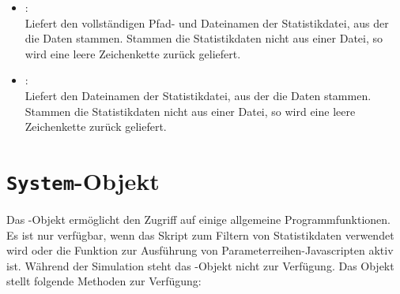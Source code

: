 \begin{itemize}

\item
{}:\\
Liefert den vollständigen Pfad- und Dateinamen der Statistikdatei, aus der die Daten stammen.
Stammen die Statistikdaten nicht aus einer Datei, so wird eine leere Zeichenkette zurück geliefert.

\item
{}:\\
Liefert den Dateinamen der Statistikdatei, aus der die Daten stammen.
Stammen die Statistikdaten nicht aus einer Datei, so wird eine leere Zeichenkette zurück geliefert.

\end{itemize}



\chapter{\texttt{System}-Objekt}

Das -Objekt ermöglicht den Zugriff auf einige allgemeine Programmfunktionen.
Es ist nur verfügbar, wenn das Skript zum Filtern von Statistikdaten verwendet wird oder
die Funktion zur Ausführung von Parameterreihen-Javascripten aktiv ist. Während der
Simulation steht das -Objekt nicht zur Verfügung. Das Objekt stellt folgende Methoden zur Verfügung:

